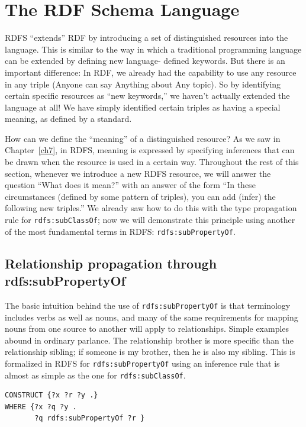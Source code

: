 \section{The RDF Schema Language}

RDFS ``extends'' RDF by introducing a set of distinguished resources
into the language. This is similar to the way in which a traditional
programming language can be extended by defining new language- defined
keywords. But there is an important difference: In RDF, we already had
the capability to use
any resource in any triple (Anyone can say Anything about Any topic). So
by identifying certain specific resources as ``new keywords,'' we
haven't actually extended the language at all! We have simply identified
certain triples as having a special meaning, as defined by a standard.

How can we define the ``meaning'' of a distinguished resource? As we saw
in Chapter~\ref{ch7}, in RDFS, meaning is expressed by specifying inferences
that can be drawn when the resource is used in a certain way. Throughout
the rest of this section, whenever we introduce a new RDFS resource, we
will answer the question ``What does it mean?'' with an answer of the
form ``In these circumstances (defined by some pattern of triples), you
can add (infer) the following new triples.'' We already saw how to do
this with the type propagation rule for \texttt{rdfs:subClassOf}; now we will
demonstrate this principle using another of the most fundamental terms
in RDFS: \texttt{rdfs:subPropertyOf}.

\subsection{Relationship propagation through rdfs:subPropertyOf}

The basic intuition behind the use of \texttt{rdfs:subPropertyOf} is that
terminology includes verbs as well as nouns, and many of the same
requirements for mapping nouns from one source to another will apply to
relationships. Simple examples abound in ordinary parlance. The
relationship brother is more specific than the relationship sibling; if
someone is my brother, then he is also my sibling. This is formalized in
RDFS for \texttt{rdfs:subPropertyOf} using an inference rule that is almost as
simple as the one for \texttt{rdfs:subClassOf}.

\begin{lstlisting}
CONSTRUCT {?x ?r ?y .}
WHERE {?x ?q ?y .
       ?q rdfs:subPropertyOf ?r }
\end{lstlisting}


